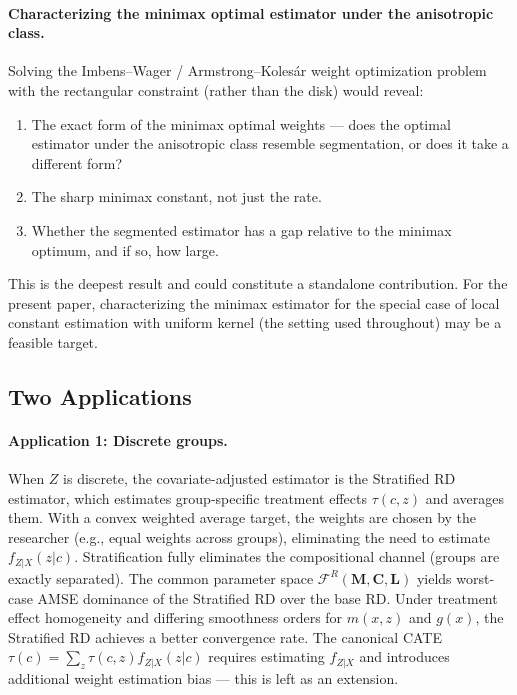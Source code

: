 \paragraph{Characterizing the minimax optimal estimator under the anisotropic class.}
Solving the Imbens--Wager / Armstrong--Kolesár weight optimization problem with the rectangular constraint (rather than the disk) would reveal:
\begin{enumerate}
	\item The exact form of the minimax optimal weights --- does the optimal estimator under the anisotropic class resemble segmentation, or does it take a different form?
	\item The sharp minimax constant, not just the rate.
	\item Whether the segmented estimator has a gap relative to the minimax optimum, and if so, how large.
\end{enumerate}
This is the deepest result and could constitute a standalone contribution.
For the present paper, characterizing the minimax estimator for the special case of local constant estimation with uniform kernel (the setting used throughout) may be a feasible target.


\subsection{Two Applications}\label{sec:overview:applications}

\paragraph{Application 1: Discrete groups.}
When $Z$ is discrete, the covariate-adjusted estimator is the Stratified RD estimator, which estimates group-specific treatment effects $\tau(c, z)$ and averages them.
With a convex weighted average target, the weights are chosen by the researcher (e.g., equal weights across groups), eliminating the need to estimate $f_{Z|X}(z|c)$.
Stratification fully eliminates the compositional channel (groups are exactly separated).
The common parameter space $\mathcal{F}^R(\mathbf{M}, \mathbf{C}, \mathbf{L})$ yields worst-case AMSE dominance of the Stratified RD over the base RD.
Under treatment effect homogeneity and differing smoothness orders for $m(x,z)$ and $g(x)$, the Stratified RD achieves a better convergence rate.
The canonical CATE $\tau(c) = \sum_z \tau(c,z) f_{Z|X}(z|c)$ requires estimating $f_{Z|X}$ and introduces additional weight estimation bias --- this is left as an extension.

